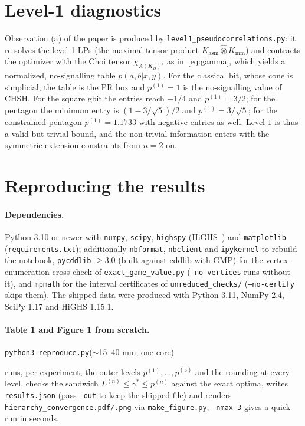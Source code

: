 \documentclass[11pt,a4paper]{article}
\newcommand*{\tmax}{\hat{\otimes}}
\newcommand*{\Kasm}{K_{\mathrm{asm}}}
\newcommand*{\Kmm}{K_{\mathrm{mm}}}
\newcommand*{\code}[1]{\texttt{#1}}
\theoremstyle{remark}
\begin{document}
\section{Level-1 diagnostics}\label{sec:level1}

Observation (a) of the paper is produced by
\code{level1\_pseudocorrelations.py}: it re-solves the level-1 LPs (the
maximal tensor product $\Kasm\tmax\Kmm$) and contracts the optimizer with
the Choi tensor $\chi_{A(K_B)^\star}$ as in~\eqref{eq:gamma}, which yields a
normalized, no-signalling table $p(a,b\vert x,y)$. For the classical bit,
whose cone is simplicial, the table is the PR box and $p^{(1)}=1$ is the
no-signalling value of CHSH. For the square gbit the entries reach $-1/4$
and $p^{(1)}=3/2$; for the pentagon the minimum entry is $(1-3/\sqrt5)/2$
and $p^{(1)}=3/\sqrt5$; for the constrained pentagon $p^{(1)}=1.1733$ with
negative entries as well. Level $1$ is thus a valid but trivial bound, and
the non-trivial information enters with the symmetric-extension
constraints from $n=2$ on.

\section{Reproducing the results}\label{sec:repro}

\paragraph{Dependencies.}
Python 3.10 or newer with \code{numpy}, \code{scipy}, \code{highspy}
(HiGHS~\cite{HiGHS}) and \code{matplotlib} (\code{requirements.txt});
additionally \code{nbformat}, \code{nbclient} and \code{ipykernel} to
rebuild the notebook, \code{pycddlib} $\geq 3.0$ (built against cddlib
with GMP) for the vertex-enumeration cross-check of
\code{exact\_game\_value.py} (\code{--no-vertices} runs without it), and
\code{mpmath} for the interval certificates of \code{unreduced\_checks/}
(\code{--no-certify} skips them). The shipped data were produced with
Python 3.11, NumPy 2.4, SciPy 1.17 and HiGHS 1.15.1.

\paragraph{Table 1 and Figure 1 from scratch.}
\begin{center}
\code{python3 reproduce.py}\qquad(\(\sim\)15--40 min, one core)
\end{center}
runs, per experiment, the outer levels $p^{(1)},\ldots,p^{(5)}$ and the
rounding at every level, checks the sandwich
$L^{(n)}\leq\gamma^*\leq p^{(n)}$ against the exact optima, writes
\code{results.json} (pass \code{--out} to keep the shipped file) and
renders \code{hierarchy\_convergence.pdf/.png} via \code{make\_figure.py};
\code{--nmax 3} gives a quick run in seconds.
\end{document}
